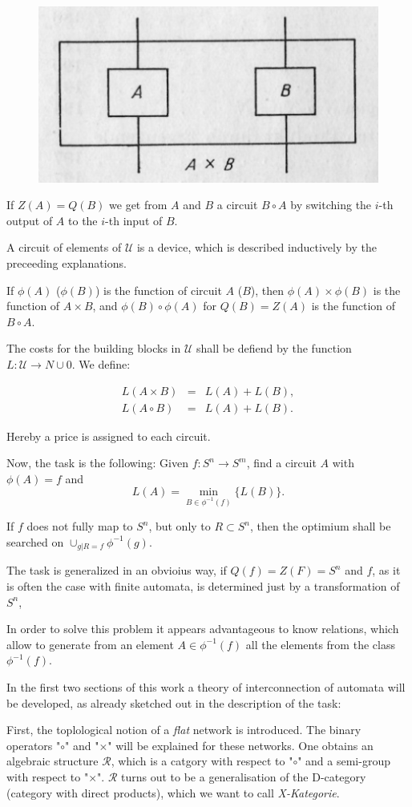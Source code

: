 \documentclass{article}
\begin{document}
\begin{figure}
\includegraphics[]{figure1.png}
\label{fig:figure1}
\caption{}
\end{figure}

If $Z(A) = Q(B)$ we get from $A$ and $B$ a circuit $B\circ A$ by switching the $i$-th output of $A$ to the $i$-th input of $B$.

A circuit of elements of $\mathcal{U}$ is a device, which is described inductively by the preceeding explanations.

If $\phi(A)$ ($\phi(B)$) is the function of circuit $A$ ($B$), then $\phi(A)\times \phi(B)$ is the function of $A\times B$, and $\phi(B)\circ \phi(A)$ for $Q(B) = Z(A)$  is the function of $B\circ A$.

The costs for the building blocks in $\mathcal{U}$ shall be defiend by the function $L : \mathcal{U} \rightarrow N \cup {0}$. We define:

\[
\begin{array}{lcr}
L(A\times B) & = & L(A) + L(B), \\
L(A\circ B) & = & L(A) + L(B).
\end{array}
\]

Hereby a price is assigned to each circuit.

Now, the task is the following: Given $f : S^n \rightarrow S^m$, find a circuit $A$ with $\phi(A) = f$ and
\[
L(A) = \min_{B \in \phi^{-1}(f)} \{ L(B) \}.
\]

If $f$ does not fully map to $S^n$, but only to $R \subset S^n$, then the optimium shall be searched on $\cup_{g|R=f} \phi^{-1}(g)$. 

The task is generalized in an obvioius way, if $Q(f) = Z(F) = S^n$ and $f$, as it is often the case with finite automata, is determined just by a transformation of $S^n$, 

In order to solve this problem it appears advantageous to know relations, which allow to generate from an element $A \in \phi^{-1}(f)$ all the elements from the class $\phi^{-1}(f)$.

In the first two sections of this work a theory of interconnection of automata will be developed, as already sketched out in the description of the task:

First, the toplological notion of a \emph{flat} network is introduced. The binary operators "$\circ$" and "$\times$" will be explained for these networks. One obtains an algebraic structure $\mathcal{R}$, which is a catgory with respect to "$\circ$" and a semi-group with respect to "$\times$". $\mathcal{R}$ turns out to be a generalisation of the D-category (category with direct products), which we want to call \emph{X-Kategorie}.
\end{document}
